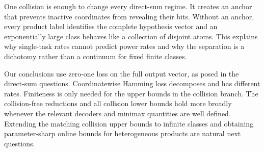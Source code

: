 \documentclass[twoside]{article}
\begin{document}
One collision is enough to change every direct-sum regime. It creates an anchor that prevents inactive coordinates from revealing their bits. Without an anchor, every product label identifies the complete hypothesis vector and an exponentially large class behaves like a collection of disjoint atoms. This explains why single-task rates cannot predict power rates and why the separation is a dichotomy rather than a continuum for fixed finite classes.

Our conclusions use zero-one loss on the full output vector, as posed in the direct-sum questions. Coordinatewise Hamming loss decomposes and has different rates. Finiteness is only needed for the upper bounds in the collision branch. The collision-free reductions and all collision lower bounds hold more broadly whenever the relevant decoders and minimax quantities are well defined. Extending the matching collision upper bounds to infinite classes and obtaining parameter-sharp online bounds for heterogeneous products are natural next questions.



\clearpage
\end{document}
